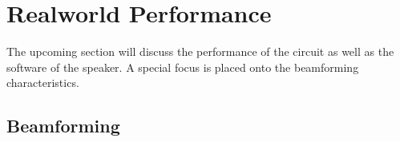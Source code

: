 \chapter{Realworld Performance}
%
The upcoming section will discuss the performance of the circuit as well as the software of the speaker. A special focus is placed onto the beamforming characteristics.
%
\clearpage
\clearpage

\section{Beamforming}

